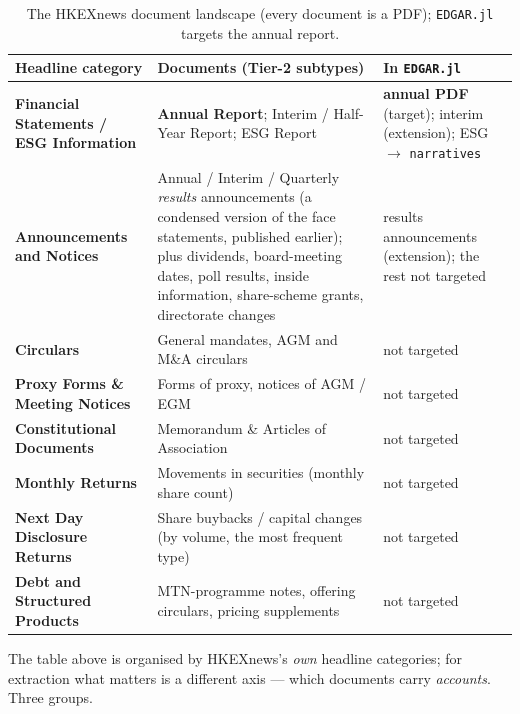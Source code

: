 \documentclass[11pt,a4paper]{report}
\begin{document}
\begin{table}[h]
\centering
\small
\caption{The HKEXnews document landscape (every document is a PDF); \texttt{EDGAR.jl} targets the annual
report.}
\label{tab:hk-forms}
\begin{tabular}{@{}p{}p{}p{}@{}}
\toprule
\textbf{Headline category} & \textbf{Documents (Tier-2 subtypes)} & \textbf{In \texttt{EDGAR.jl}} \\
\midrule
\textbf{Financial Statements / ESG Information} & \textbf{Annual Report}; Interim / Half-Year Report; ESG
  Report & \textbf{annual PDF} (target); interim (extension); ESG $\to$ \texttt{narratives} \\
\textbf{Announcements and Notices} & Annual / Interim / Quarterly \emph{results} announcements (a condensed
  version of the face statements, published earlier); plus dividends, board-meeting dates, poll results,
  inside information, share-scheme grants, directorate changes & results announcements (extension); the rest
  not targeted \\
\textbf{Circulars} & General mandates, AGM and M\&A circulars & not targeted \\
\textbf{Proxy Forms \& Meeting Notices} & Forms of proxy, notices of AGM / EGM & not targeted \\
\textbf{Constitutional Documents} & Memorandum \& Articles of Association & not targeted \\
\textbf{Monthly Returns} & Movements in securities (monthly share count) & not targeted \\
\textbf{Next Day Disclosure Returns} & Share buybacks / capital changes (by volume, the most frequent type) &
  not targeted \\
\textbf{Debt and Structured Products} & MTN-programme notes, offering circulars, pricing supplements & not
  targeted \\
\bottomrule
\end{tabular}
\end{table}

\noindent The table above is organised by HKEXnews's \emph{own} headline categories; for extraction what
matters is a different axis --- which documents carry \emph{accounts}. Three groups.
\end{document}
